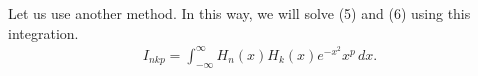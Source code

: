 \documentclass[floatfix,nofootinbib,superscriptaddress,fleqn]{revtex4-2}
\begin{document}
Let us use another method.
In this way, we will solve (5) and (6) using this integration.
\begin{align}
  I_{nkp} = \int^{\infty}_{-\infty}H_n(x)H_k(x)e^{-x^2}x^p\,dx.
\end{align}
\end{document}
